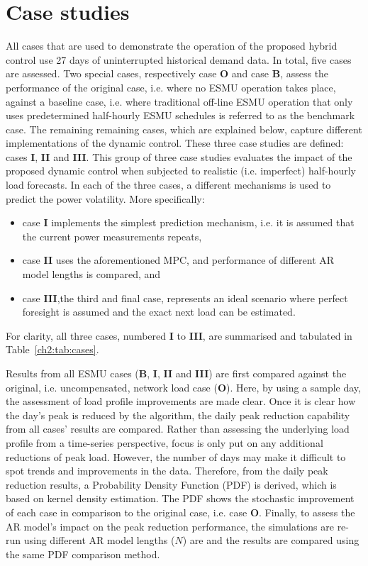 \section{Case studies}
\label{ch2:sec:case-studies}

All cases that are used to demonstrate the operation of the proposed hybrid control use 27 days of uninterrupted historical demand data.
In total, five cases are assessed.
Two special cases, respectively case \textbf{O} and case \textbf{B}, assess the performance of the original case, i.e. where no ESMU operation takes place, against a baseline case, i.e.  where traditional off-line ESMU operation that only uses predetermined half-hourly ESMU schedules is referred to as the benchmark case.
The remaining remaining cases, which are explained below, capture different implementations of the dynamic control.
These three case studies are defined: cases \textbf{I}, \textbf{II} and \textbf{III}.
This group of three case studies evaluates the impact of the proposed dynamic control when subjected to realistic (i.e. imperfect) half-hourly load forecasts.
In each of the three cases, a different mechanisms is used to predict the power volatility.
More specifically:
\begin{itemize}
	\item case \textbf{I} implements the simplest prediction mechanism, i.e. it is assumed that the current power measurements repeats,
	\item case \textbf{II} uses the aforementioned MPC, and performance of different AR model lengths is compared, and
	\item case \textbf{III},the third and final case, represents an ideal scenario where perfect foresight is assumed and the exact next load can be estimated.
\end{itemize}
For clarity, all three cases, numbered \textbf{I} to \textbf{III}, are summarised and tabulated in Table~\ref{ch2:tab:cases}.



Results from all ESMU cases (\textbf{B}, \textbf{I}, \textbf{II} and \textbf{III}) are first compared against the original, i.e. uncompensated, network load case (\textbf{O}).
Here, by using a sample day, the assessment of load profile improvements are made clear.
Once it is clear how the day's peak is reduced by the algorithm, the daily peak reduction capability from all cases' results are compared.
Rather than assessing the underlying load profile from a time-series perspective, focus is only put on any additional reductions of peak load.
However, the number of days may make it difficult to spot trends and improvements in the data.
Therefore, from the daily peak reduction results, a Probability Density Function (PDF) is derived, which is based on kernel density estimation.
The PDF shows the stochastic improvement of each case in comparison to the original case, i.e. case \textbf{O}.
Finally, to assess the AR model's impact on the peak reduction performance, the simulations are re-run using different AR model lengths ($N$) are and the results are compared using the same PDF comparison method.
